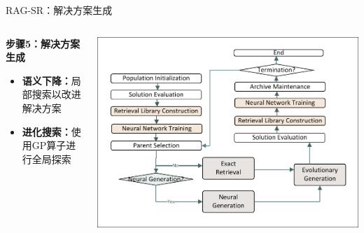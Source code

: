\documentclass[aspectratio=1610]{beamer}
\begin{document}
    \begin{frame}{RAG-SR：解决方案生成}
        \begin{columns}
            \begin{column}{0.5\textwidth}
                \textbf{步骤5：解决方案生成}
                \begin{itemize}
                    \item \textbf{语义下降：}局部搜索以改进解决方案
                    \item \textbf{进化搜索：}使用GP算子进行全局探索
                \end{itemize}
            \end{column}
            \begin{column}{0.5\textwidth}
                \includegraphics[width=1.0\textwidth]{figs/Workflow.pdf}
            \end{column}
        \end{columns}
    \end{frame}
\end{document}

